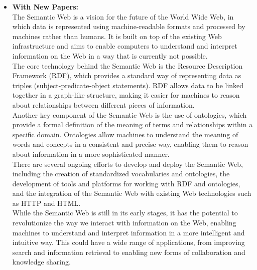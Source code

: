 \documentclass[fleqn,moreauthors,10pt]{ds_report}
\begin{document}
\begin{itemize}
  \item \textbf{With New Papers:} \\
  The Semantic Web is a vision for the future of the World Wide Web, in which data is represented using machine-readable formats and processed by machines rather than humans. It is built on top of the existing Web infrastructure and aims to enable computers to understand and interpret information on the Web in a way that is currently not possible. \\[6pt]
  The core technology behind the Semantic Web is the Resource Description Framework (RDF), which provides a standard way of representing data as triples (subject-predicate-object statements). RDF allows data to be linked together in a graph-like structure, making it easier for machines to reason about relationships between different pieces of information. \\[6pt]
  Another key component of the Semantic Web is the use of ontologies, which provide a formal definition of the meaning of terms and relationships within a specific domain. Ontologies allow machines to understand the meaning of words and concepts in a consistent and precise way, enabling them to reason about information in a more sophisticated manner. \\[6pt]
  There are several ongoing efforts to develop and deploy the Semantic Web, including the creation of standardized vocabularies and ontologies, the development of tools and platforms for working with RDF and ontologies, and the integration of the Semantic Web with existing Web technologies such as HTTP and HTML. \\[6pt]
  While the Semantic Web is still in its early stages, it has the potential to revolutionize the way we interact with information on the Web, enabling machines to understand and interpret information in a more intelligent and intuitive way. This could have a wide range of applications, from improving search and information retrieval to enabling new forms of collaboration and knowledge sharing.


\end{itemize}
\end{document}
